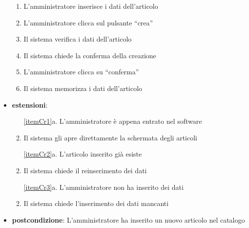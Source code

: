 \begin{itemize}
\begin{enumerate}
    	\item L’amministratore inserisce i dati dell’articolo
    	\item L’amministratore clicca sul pulsante “crea”
    	\label{itemCr2}
    	\item Il sistema verifica i dati dell’articolo
    	\label{itemCr3}
    	\item Il sistema chiede la conferma della creazione
    	\item L’amministratore clicca su “conferma”
    	\item Il sistema memorizza i dati dell’articolo
    \end{enumerate}

    \item \textbf{estensioni}:
    \begin{enumerate}
		\item[\ref{itemCr1}a.] L’amministratore è appena entrato nel software
		\item Il sistema gli apre direttamente la schermata degli articoli
	\end{enumerate}
        
	\begin{enumerate}
		\item[\ref{itemCr2}a.] L’articolo inserito già esiste
		\item Il sistema chiede il reinserimento dei dati
	\end{enumerate}
        
	\begin{enumerate}
		\item[\ref{itemCr3}a.] L’amministratore non ha inserito dei dati
		\item Il sistema chiede l’inserimento dei dati mancanti
	\end{enumerate}	
            
    \item \textbf{postcondizione}: L’amministratore ha inserito un nuovo articolo nel catalogo
\end{itemize}
		


